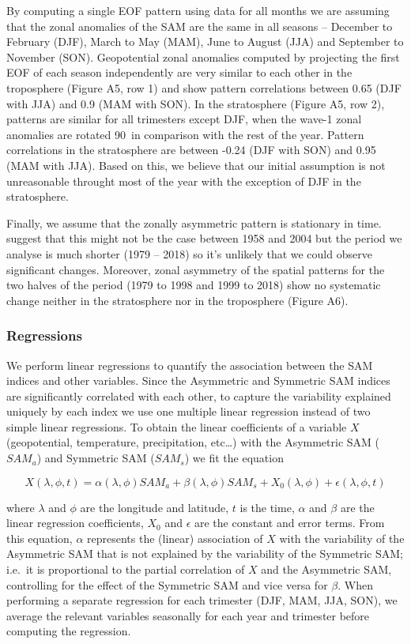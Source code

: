 \documentclass[]{ametsocV5}
\begin{document}
By computing a single EOF pattern using data for all months we are assuming that the zonal anomalies of the SAM are the same in all seasons -- December to February (DJF), March to May (MAM), June to August (JJA) and September to November (SON). Geopotential zonal anomalies computed by projecting the first EOF of each season independently are very similar to each other in the troposphere (Figure A5, row 1) and show pattern correlations between 0.65 (DJF with JJA) and 0.9 (MAM with SON). In the stratosphere (Figure A5, row 2), patterns are similar for all trimesters except DJF, when the wave-1 zonal anomalies are rotated 90\degree~in comparison with the rest of the year. Pattern correlations in the stratosphere are between -0.24 (DJF with SON) and 0.95 (MAM with JJA). Based on this, we believe that our initial assumption is not unreasonable throught most of the year with the exception of DJF in the stratosphere.

Finally, we assume that the zonally asymmetric pattern is stationary in time. \citet{silvestri2009} suggest that this might not be the case between 1958 and 2004 but the period we analyse is much shorter (1979 -- 2018) so it's unlikely that we could observe significant changes. Moreover, zonal asymmetry of the spatial patterns for the two halves of the period (1979 to 1998 and 1999 to 2018) show no systematic change neither in the stratosphere nor in the troposphere (Figure A6).

\subsubsection{Regressions}

We perform linear regressions to quantify the association between the SAM indices and other variables. Since the Asymmetric and Symmetric SAM indices are significantly correlated with each other, to capture the variability explained uniquely by each index we use one multiple linear regression instead of two simple linear regressions. To obtain the linear coefficients of a variable \(X\) (geopotential, temperature, precipitation, etc\ldots{}) with the Asymmetric SAM (\(SAM_a\)) and Symmetric SAM (\(SAM_s\)) we fit the equation

\[
X(\lambda, \phi, t) = \alpha(\lambda, \phi) SAM_a + \beta(\lambda, \phi) SAM_s + X_0(\lambda, \phi) +  \epsilon(\lambda, \phi, t)
\]

where \(\lambda\) and \(\phi\) are the longitude and latitude, \(t\) is the time, \(\alpha\) and \(\beta\) are the linear regression coefficients, \(X_0\) and \(\epsilon\) are the constant and error terms. From this equation, \(\alpha\) represents the (linear) association of \(X\) with the variability of the Asymmetric SAM that is not explained by the variability of the Symmetric SAM; i.e.~it is proportional to the partial correlation of \(X\) and the Asymmetric SAM, controlling for the effect of the Symmetric SAM and vice versa for \(\beta\). When performing a separate regression for each trimester (DJF, MAM, JJA, SON), we average the relevant variables seasonally for each year and trimester before computing the regression.
\end{document}
